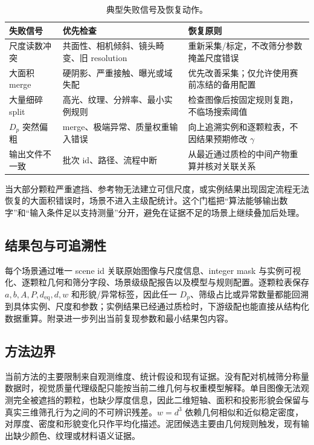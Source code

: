 \begin{table}[H]
\centering
\caption{典型失败信号及恢复动作。}
\label{tab:r-final-recovery}
\footnotesize
\renewcommand{\arraystretch}{1.1}
\begin{tabular}{>{\raggedright\arraybackslash}p{3.0cm}>{\raggedright\arraybackslash}p{4.2cm}>{\raggedright\arraybackslash}p{6.0cm}}
\toprule
失败信号 & 优先检查 & 恢复原则 \\
\midrule
尺度读数冲突 & 共面性、相机倾斜、镜头畸变、旧 resolution & 重新采集/标定，不改筛分参数掩盖尺度错误 \\
大面积 merge & 硬阴影、严重接触、曝光或域失配 & 优先改善采集；仅允许使用赛前冻结的备用配置 \\
大量细碎 split & 高光、纹理、分辨率、最小实例规则 & 检查图像后按固定规则复跑，不临场搜索阈值 \\
$D_p$ 突然偏粗 & merge、极端异常、质量权重输入错误 & 向上追溯实例和逐颗粒表，不因结果预期修改 $\gamma$ \\
输出文件不一致 & 批次 id、路径、流程中断 & 从最近通过质检的中间产物重算并核对关联关系 \\
\bottomrule
\end{tabular}
\end{table}

当大部分颗粒严重遮挡、参考物无法建立可信尺度，或实例结果出现固定流程无法恢复的大面积错误时，场景不进入主级配统计。这个门槛把“算法能够输出数字”和“输入条件足以支持测量”分开，避免在证据不足的场景上继续叠加后处理。

\subsection{结果包与可追溯性}

每个场景通过唯一 scene id 关联原始图像与尺度信息、integer mask 与实例可视化、逐颗粒几何和筛分字段、场景级级配报告以及模型与规则配置。逐颗粒表保存 $a,b,A,P,d_{\mathrm{eq}},d,w$ 和形貌/异常标签，因此任一 $D_p$、筛级占比或异常数量都能回溯到具体实例、尺度和参数；实例结果已经通过质检时，下游级配也能直接从结构化数据重算。附录进一步列出当前复现参数和最小结果包内容。

\subsection{方法边界}

当前方法的主要限制来自观测维度、统计假设和现有证据。没有配对机械筛分称量数据时，视觉质量代理级配只能按当前二维几何与权重模型解释。单目图像无法观测完全被遮挡的颗粒，也缺少厚度信息，因此二维短轴、面积和投影形貌会保留与真实三维筛孔行为之间的不可辨识残差。$w=d^3$ 依赖几何相似和近似稳定密度，对厚度、密度和形貌变化只作平均化描述。泥团候选主要由几何规则触发，现有输出缺少颜色、纹理或材料语义证据。

